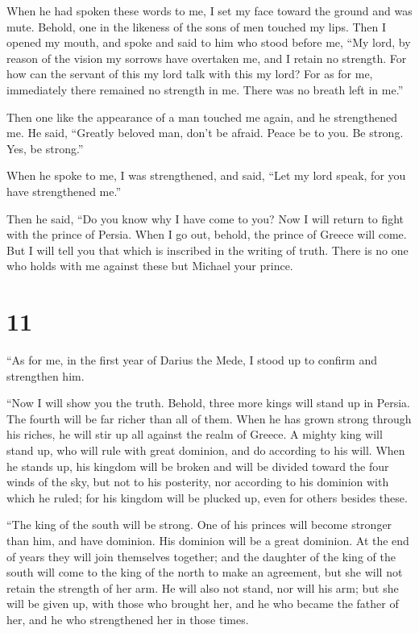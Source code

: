  When he had spoken these words to me, I set my face toward
the ground and was mute.  Behold, one in the likeness of
the sons of men touched my lips. Then I opened my mouth, and spoke and
said to him who stood before me, ``My lord, by reason of the vision my
sorrows have overtaken me, and I retain no strength.  For
how can the servant of this my lord talk with this my lord? For as for
me, immediately there remained no strength in me. There was no breath
left in me.''

 Then one like the appearance of a man touched me again,
and he strengthened me.  He said, ``Greatly beloved man,
don't be afraid. Peace be to you. Be strong. Yes, be strong.''

When he spoke to me, I was strengthened, and said, ``Let my lord speak,
for you have strengthened me.''

 Then he said, ``Do you know why I have come to you? Now I
will return to fight with the prince of Persia. When I go out, behold,
the prince of Greece will come.  But I will tell you that
which is inscribed in the writing of truth. There is no one who holds
with me against these but Michael your prince.

\hypertarget{section-10}{%
\section{11}\label{section-10}}

 ``As for me, in the first year of Darius the Mede, I stood
up to confirm and strengthen him.

 ``Now I will show you the truth. Behold, three more kings
will stand up in Persia. The fourth will be far richer than all of them.
When he has grown strong through his riches, he will stir up all against
the realm of Greece.  A mighty king will stand up, who will
rule with great dominion, and do according to his will. 
When he stands up, his kingdom will be broken and will be divided toward
the four winds of the sky, but not to his posterity, nor according to
his dominion with which he ruled; for his kingdom will be plucked up,
even for others besides these.

 ``The king of the south will be strong. One of his princes
will become stronger than him, and have dominion. His dominion will be a
great dominion.  At the end of years they will join
themselves together; and the daughter of the king of the south will come
to the king of the north to make an agreement, but she will not retain
the strength of her arm. He will also not stand, nor will his arm; but
she will be given up, with those who brought her, and he who became the
father of her, and he who strengthened her in those times.

